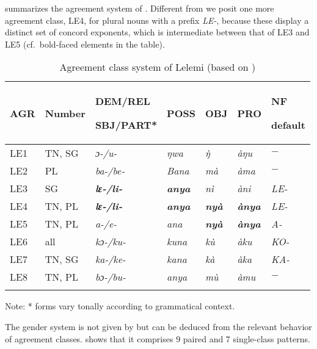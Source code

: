 \documentclass[output=collectionpaper]{langsci/langscibook}
\begin{document}
\z


 summarizes the agreement system of . Different from \citet{Allan1973} we posit one more agreement class, LE4, for plural nouns with a prefix \mbox{\textit{LE-},} because these display a distinct set of concord exponents, which is intermediate between that of LE3 and LE5 (cf.\ bold-faced elements in the table).

\begin{table}[htb]

\begin{tabularx}{\textwidth}{lXXXXXX}
\lsptoprule

AGR & Number & DEM/REL

SBJ/PART* & POSS & OBJ & PRO & {NF}

default\\
\midrule
LE1 & TN, SG & \itshape ɔ{}-/u- & \itshape ŋwa & \itshape \`{ŋ} & \itshape àŋu &  $-$\\
LE2 & PL & \itshape ba-/be{}- & \itshape Bana & \itshape mà & \itshape àma &  $-$\\
LE3 & SG & \bfseries\itshape lɛ{}-/li- & \bfseries\itshape anya & \itshape nì & \itshape àni & \itshape LE{}-\\
LE4 & TN, PL & \bfseries\itshape lɛ{}-/li- & \bfseries\itshape anya & \bfseries\itshape nyà & \bfseries\itshape ànya & \itshape LE{}-\\
LE5 & TN, PL & \itshape a-/e{}- & \itshape ana & \bfseries\itshape nyà & \bfseries\itshape ànya & \itshape A{}-\\
LE6 & all & \itshape kɔ{}-/ku{}- & \itshape kuna & \itshape kù & \itshape àku & \itshape KO{}-\\
LE7 & TN, SG & \itshape ka{}-/ke{}- & \itshape kana & \itshape kà & \itshape àka & \itshape KA{}-\\
LE8 & TN, PL & \itshape bɔ{}-/bu- & \itshape anya & \itshape mù & \itshape àmu &  $-$\\
\lspbottomrule
\end{tabularx}
{\small Note: * forms vary tonally according to grammatical context.}

\caption{Agreement class system of Lelemi (based on \citealt{Allan1973})}
\label{tab:Gueld:10}
\end{table}

The gender system is not given by \citet{Allan1973} but can be deduced from the relevant behavior of agreement classes.  shows that it comprises 9 paired and 7 single-class patterns.
\end{document}
